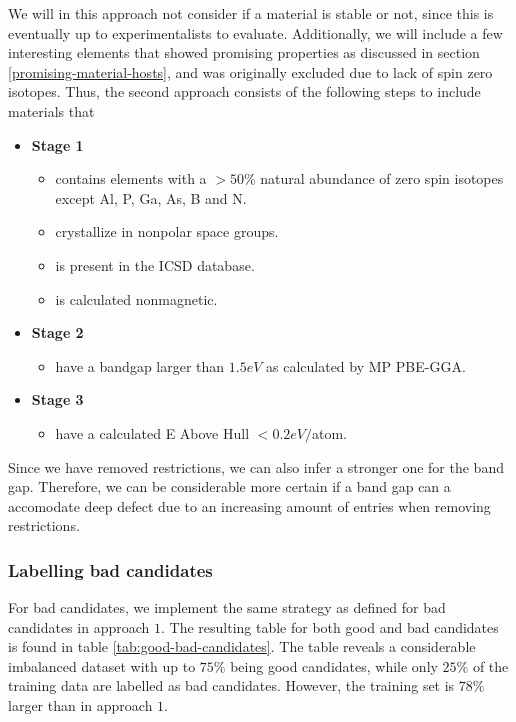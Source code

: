 We will in this approach not consider if a material is stable or not, since this is eventually up to experimentalists to evaluate. Additionally, we will include a few interesting elements that showed promising properties as discussed in section \ref{promising-material-hosts}, and was originally excluded due to lack of spin zero isotopes. Thus, the second approach consists of the following steps to include materials that

\begin{itemize}
  \item[]{\textbf{Stage 1}}
  \begin{itemize}
  \item contains elements with a $>50\%$ natural abundance of zero spin isotopes except Al, P, Ga, As, B and N.
  \item crystallize in nonpolar space groups.
  \item is present in the ICSD database.
  \item is calculated nonmagnetic.
  \end{itemize}
  \item[]{\textbf{Stage 2}}
  \begin{itemize}
  \item have a bandgap larger than $1.5eV$ as calculated by MP PBE-GGA.
  \end{itemize}
  \item[]{\textbf{Stage 3}}
  \begin{itemize}
  \item have a calculated E Above Hull $<0.2eV/$atom.
  \end{itemize}
\end{itemize}

Since we have removed restrictions, we can also infer a stronger one for the band gap. Therefore, we can be considerable more certain if a band gap can a accomodate deep defect due to an increasing amount of entries when removing restrictions.

\subsubsection{Labelling bad candidates}

For bad candidates, we implement the same strategy as defined for bad candidates in approach $1$. The resulting table for both good and bad candidates is found in table \ref{tab:good-bad-candidates}. The table reveals a considerable imbalanced dataset with up to $75 \%$ being good candidates, while only $25 \%$ of the training data are labelled as bad candidates. However, the training set is $78 \%$ larger than in approach $1$.

